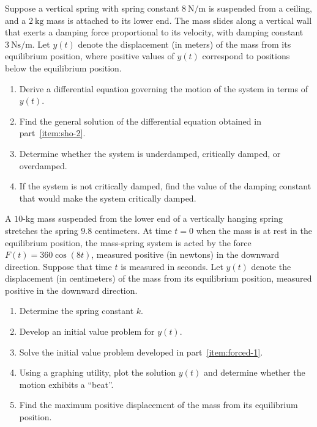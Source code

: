 \begin{Exercise}[title={Mixed Spring Mass and Electrical Network Systems}]
	\Question\label{3-6-2} Suppose a vertical spring with spring constant \( 8 \ \mathrm{N/m} \) is suspended from a ceiling, and a \( 2 \ \mathrm{kg} \) mass is attached to its lower end. The mass slides along a vertical wall that exerts a damping force proportional to its velocity, with damping constant \( 3 \ \mathrm{Ns/m} \).
	Let \( y(t) \) denote the displacement (in meters) of the mass from its equilibrium position, where positive values of \( y(t) \) correspond to positions below the equilibrium position.
	\begin{enumerate}[label =\textbf{\roman*.}, noitemsep]
		\item\label{item:sho-2} Derive a differential equation governing the motion of the system in terms of \( y(t) \).
		\item Find the general solution of the differential equation obtained in part~\ref{item:sho-2}.
		\item Determine whether the system is underdamped, critically damped, or overdamped.
		\item  If the system is not critically damped, find the value of the damping constant that would make the system critically damped.
	\end{enumerate}
	\Question\label{3-6-3} A \( 10 \)-kg mass suspended from the lower 
	end of a vertically hanging spring stretches the spring
	\( 9.8 \) centimeters.  At time \( t = 0 \) when the mass is at rest in the equilibrium position, the 
	 mass-spring system is acted by the force \( F(t) = 360\cos(8t) \),
 measured positive (in newtons) in the downward direction. Suppose that time \(t\) is measured in 
	seconds. Let $y(t)$ denote the displacement (in centimeters) of the mass from its equilibrium position, measured positive in the downward direction.
	\begin{enumerate}[label =\textbf{\roman*.}, noitemsep]
	\item Determine the spring constant $k$.
	\item\label{item:forced-1} Develop an initial value problem for $y(t)$.
	\item Solve the initial value problem developed in part~\ref{item:forced-1}.
	\item Using a graphing utility, plot the solution $y(t)$ and determine whether the motion exhibits a ``beat''.
	\item Find the maximum positive displacement of the mass from its equilibrium position.
	\end{enumerate}
	

\end{Exercise}

